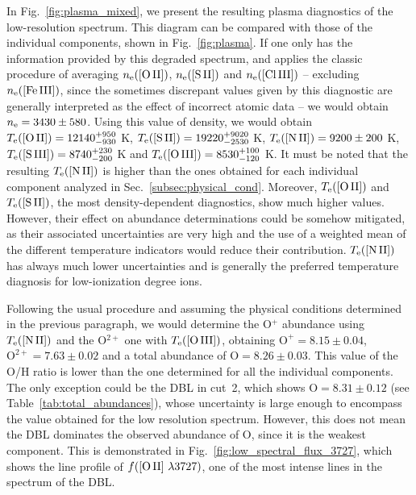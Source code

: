 \documentclass[twocolumn]{aastex63}
\begin{document}
In Fig.~\ref{fig:plasma_mixed}, we present the resulting plasma diagnostics of the low-resolution spectrum. This diagram can be compared with those of the individual components, shown in Fig.~\ref{fig:plasma}. If one only has the information provided by this degraded spectrum, and applies the classic procedure of averaging $n_{\rm e}(\text{[O\thinspace II]})$,  $n_{\rm e}(\text{[S\thinspace II]})$ and  $n_{\rm e}(\text{[Cl\thinspace III]})$ -- excluding $n_{\rm e}(\text{[Fe\thinspace III]})$, since the sometimes discrepant values given by this diagnostic are generally interpreted as the effect of incorrect atomic data --  we would obtain $n_{\rm e}= 3430 \pm 580 $. Using this value of density, we would obtain  $T_{\rm e}(\text{[O\thinspace II]})=12140^{+950} _{-930}$ K, $T_{\rm e}(\text{[S\thinspace II]})=19220^{+9020} _{-2530}$ K, $T_{\rm e}(\text{[N\thinspace II]})=9200\pm 200$ K, $T_{\rm e}(\text{[S\thinspace III]})=8740^{+230} _{-200}$ K and $T_{\rm e}(\text{[O\thinspace III]})=8530^{+100} _{-120}$ K. It must be noted that the resulting $T_{\rm e}(\text{[N\thinspace II]})$ is higher than the ones obtained for each individual component analyzed in Sec.~\ref{subsec:physical_cond}. Moreover, $T_{\rm e}(\text{[O\thinspace II]})$ and $T_{\rm e}(\text{[S\thinspace II]})$, the most density-dependent diagnostics, show much higher values. However, their effect on abundance determinations could be somehow mitigated, as their associated uncertainties are very high and the use of a weighted mean of the different temperature indicators would reduce their contribution. $T_{\rm e}(\text{[N\thinspace II]})$ has always much lower uncertainties and is generally the preferred temperature diagnosis for low-ionization degree ions.

Following the usual procedure and assuming the physical conditions determined in the previous paragraph, we would determine the O$^{+}$ abundance using $T_{\rm e}(\text{[N\thinspace II]})$ and the O$^{2+}$ one with  $T_{\rm e}(\text{[O\thinspace III]})$, obtaining $\text{O}^{+}=8.15\pm 0.04$, $\text{O}^{2+}=7.63 \pm 0.02$ and a total abundance of $\text{O}=8.26 \pm 0.03$. This value of the O/H ratio is lower than the one determined for all the individual components. The only exception could be the DBL in cut~2, which shows $\text{O}=8.31 \pm 0.12$ (see Table~\ref{tab:total_abundances}), whose uncertainty is large enough to encompass the value obtained for the low resolution spectrum. However, this does not mean the DBL dominates the observed abundance of O, since it is the weakest component. This is demonstrated in Fig.~\ref{fig:low_spectral_flux_3727}, which shows the line profile of $f(\text{[O\thinspace II] } \lambda 3727)$, one of the most intense lines in the spectrum of the DBL.
\end{document}

